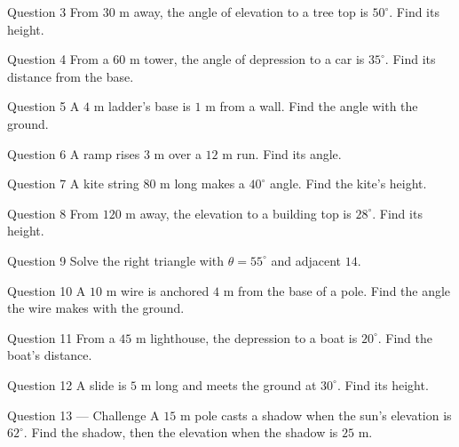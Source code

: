 \documentclass[11pt]{article}
\begin{document}
\begin{qbox}{Question 3}
From $30$ m away, the angle of elevation to a tree top is $50^\circ$. Find its height.\workspace{2.4cm}
\end{qbox}

\begin{qbox}{Question 4}
From a $60$ m tower, the angle of depression to a car is $35^\circ$. Find its distance from the base.\workspace{2.6cm}
\end{qbox}

\begin{qbox}{Question 5}
A $4$ m ladder's base is $1$ m from a wall. Find the angle with the ground.\workspace{2.4cm}
\end{qbox}

\begin{qbox}{Question 6}
A ramp rises $3$ m over a $12$ m run. Find its angle.\workspace{2.2cm}
\end{qbox}

\begin{qbox}{Question 7}
A kite string $80$ m long makes a $40^\circ$ angle. Find the kite's height.\workspace{2.2cm}
\end{qbox}

\begin{qbox}{Question 8}
From $120$ m away, the elevation to a building top is $28^\circ$. Find its height.\workspace{2.4cm}
\end{qbox}

\begin{qbox}{Question 9}
Solve the right triangle with $\theta=55^\circ$ and adjacent $14$.\workspace{2.6cm}
\end{qbox}

\begin{qbox}{Question 10}
A $10$ m wire is anchored $4$ m from the base of a pole. Find the angle the wire makes with the ground.\workspace{2.4cm}
\end{qbox}

\begin{qbox}{Question 11}
From a $45$ m lighthouse, the depression to a boat is $20^\circ$. Find the boat's distance.\workspace{2.4cm}
\end{qbox}

\begin{qbox}{Question 12}
A slide is $5$ m long and meets the ground at $30^\circ$. Find its height.\workspace{2.2cm}
\end{qbox}

\begin{qbox}{Question 13 --- Challenge}
A $15$ m pole casts a shadow when the sun's elevation is $62^\circ$. Find the shadow, then the elevation when the shadow is $25$ m.\workspace{3.2cm}
\end{qbox}
\end{document}
